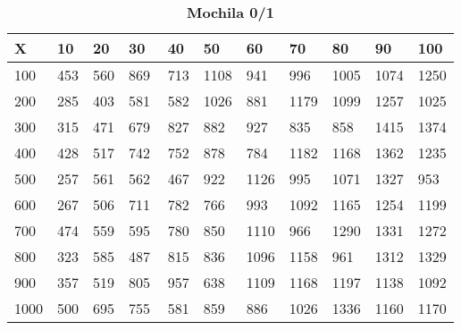 \documentclass[10pt,letterpaper]{article}
\begin{document}
\newpage 
{}
\begin{center}
\begin{table}\renewcommand{\arraystretch}{2.5}
\caption{\large \textbf{Mochila 0/1}}
\centering
\begin{tabular} { |m{0.5cm}|m{1.3cm}|m{1.3cm}|m{1.3cm}|m{1.3cm}|m{1.3cm}|m{1.3cm}|m{1.3cm}|m{1.3cm}|m{1.3cm}|m{1.3cm}|} 
\hline
\rowcolor{Gray}
\centering \textbf{X} & \centering \textbf{10} & \centering \textbf{20} & \centering \textbf{30}\ & \centering \textbf{40} & \centering \textbf{50} & \centering \textbf{60}\ & \centering \textbf{70} & \centering \textbf{80} & \centering \textbf{90}\ & \textbf{100} \\\hline
\cellcolor{Gray}100 & \Large 453 & \Large 560 & \Large 869 & \Large 713 & \Large 1108 & \Large 941 & \Large 996 & \Large 1005 & \Large 1074 & \Large 1250 \\
\hline
\cellcolor{Gray}200 & \Large 285 & \Large 403 & \Large 581 & \Large 582 & \Large 1026 & \Large 881 & \Large 1179 & \Large 1099 & \Large 1257 & \Large 1025 \\
\hline
\cellcolor{Gray}300 & \Large 315 & \Large 471 & \Large 679 & \Large 827 & \Large 882 & \Large 927 & \Large 835 & \Large 858 & \Large 1415 & \Large 1374 \\
\hline
\cellcolor{Gray}400 & \Large 428 & \Large 517 & \Large 742 & \Large 752 & \Large 878 & \Large 784 & \Large 1182 & \Large 1168 & \Large 1362 & \Large 1235 \\
\hline
\cellcolor{Gray}500 & \Large 257 & \Large 561 & \Large 562 & \Large 467 & \Large 922 & \Large 1126 & \Large 995 & \Large 1071 & \Large 1327 & \Large 953 \\
\hline
\cellcolor{Gray}600 & \Large 267 & \Large 506 & \Large 711 & \Large 782 & \Large 766 & \Large 993 & \Large 1092 & \Large 1165 & \Large 1254 & \Large 1199 \\
\hline
\cellcolor{Gray}700 & \Large 474 & \Large 559 & \Large 595 & \Large 780 & \Large 850 & \Large 1110 & \Large 966 & \Large 1290 & \Large 1331 & \Large 1272 \\
\hline
\cellcolor{Gray}800 & \Large 323 & \Large 585 & \Large 487 & \Large 815 & \Large 836 & \Large 1096 & \Large 1158 & \Large 961 & \Large 1312 & \Large 1329 \\
\hline
\cellcolor{Gray}900 & \Large 357 & \Large 519 & \Large 805 & \Large 957 & \Large 638 & \Large 1109 & \Large 1168 & \Large 1197 & \Large 1138 & \Large 1092 \\
\hline
\cellcolor{Gray}1000 & \Large 500 & \Large 695 & \Large 755 & \Large 581 & \Large 859 & \Large 886 & \Large 1026 & \Large 1336 & \Large 1160 & \Large 1170 \\
\hline
\end{tabular} \\
\end{table}
\end{center}
\end{document}
